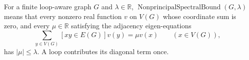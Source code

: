 \begin{definition}
For a finite loop-aware graph $G$ and $\lambda\in\mathbb R$,
$\operatorname{NonprincipalSpectralBound}(G,\lambda)$ means that every
nonzero real function $v$ on $V(G)$ whose coordinate sum is zero, and every
$\mu\in\mathbb R$ satisfying the adjacency eigen-equations
\[
 \sum_{y\in V(G)}[xy\in E(G)]v(y)=\mu v(x)
 \qquad(x\in V(G)),
\]
has $|\mu|\leq\lambda$.  A loop contributes its diagonal term once.
\end{definition}
